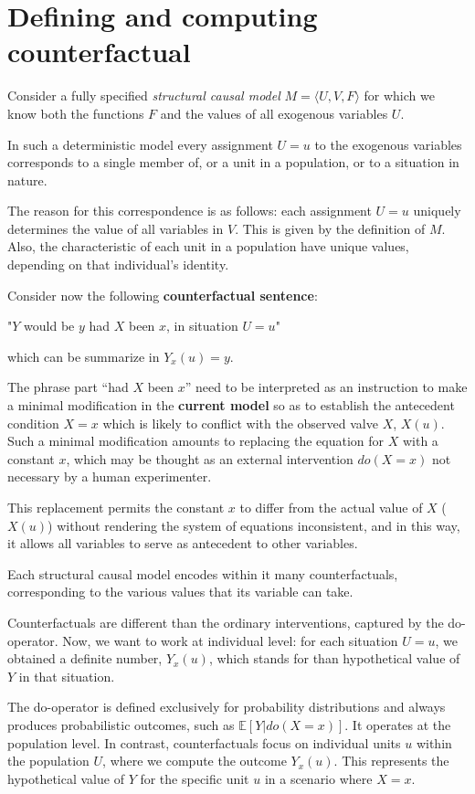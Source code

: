 \section{Defining and computing counterfactual}
Consider a fully specified \textit{structural causal model} $M=\langle U, V,F \rangle$
for which we know both the functions $F$ and the values of all exogenous variables $U$.

In such a deterministic model every assignment $U = u$ to the exogenous variables
corresponds to a single member of, or a unit in a population, or to a situation
in nature.

The reason for this correspondence is as follows: each assignment $U = u$ uniquely
determines the value of all variables in $V$. This is given by the definition of $M$.
Also, the characteristic of each unit in a population have unique values, depending
on that individual's identity.

Consider now the following \textbf{counterfactual sentence}:
\begin{center}
    "$Y$ would be $y$ had $X$ been $x$, in situation $U=u$"
\end{center}
which can be summarize in $Y_x(u) = y$.

The phrase part ``had $X$ been $x$'' need to be interpreted as an instruction to
make a minimal modification in the \textbf{current model} so as to establish the
antecedent condition $X = x$ which is likely to conflict with the observed valve
$X$, $X(u)$. Such a minimal modification amounts to replacing the equation for
$X$ with a constant $x$, which may be thought as an external intervention $do(X = x)$
not necessary by a human experimenter.

This replacement permits the constant $x$ to differ from the actual value of $X$
($X(u)$) without rendering the system of equations inconsistent, and in this way,
it allows all variables to serve as antecedent to other variables.

Each structural causal model encodes within it many counterfactuals, corresponding
to the various values that its variable can take.

Counterfactuals are different than the ordinary interventions, captured by the
do-operator. Now, we want to work at individual level: for each situation $U = u$,
we obtained a definite number, $Y_x (u)$, which stands for than hypothetical value
of $Y$ in that situation.

The do-operator is defined exclusively for probability distributions and always
produces probabilistic outcomes, such as $\mathbb{E}[Y|do(X = x)]$. It operates at
the population level. In contrast, counterfactuals focus on individual units
$u$ within the population $U$, where we compute the outcome $Y_x(u)$. This represents
the hypothetical value of $Y$ for the specific unit $u$ in a scenario where $X = x$.

